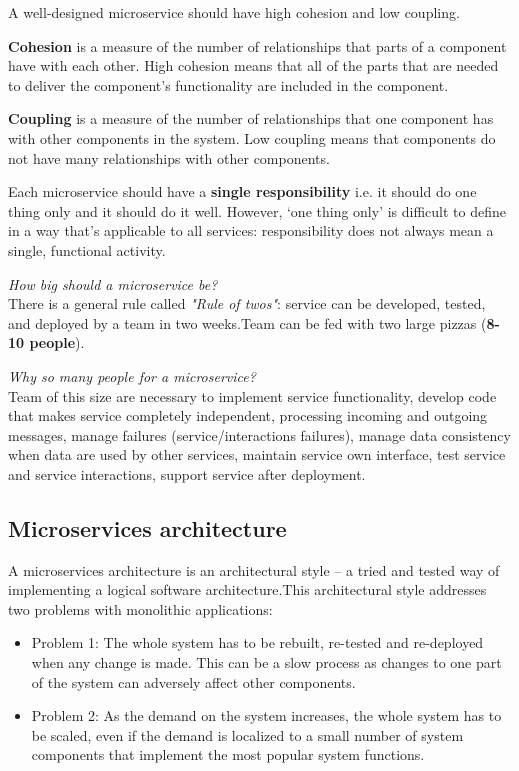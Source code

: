 \documentclass[10pt,a4paper]{report}
\begin{document}
A well-designed microservice should have high cohesion and low coupling.

\textbf{Cohesion} is a measure of the number of relationships that parts of a component have with each other. High cohesion means that all of the parts that are needed to deliver the component’s functionality are included in the component.

\textbf{Coupling} is a measure of the number of relationships that one component has with other components in the system. Low coupling means that components do not have many relationships with other components.

Each microservice should have a \textbf{single responsibility} i.e. it should do one thing only and it should do it well.
However, ‘one thing only’ is difficult to define in a way that’s applicable to all services: responsibility does not always mean a single, functional activity.

\textit{How big should a microservice be?} \\ 
There is a general rule called \textit{"Rule of twos"}: service can be developed, tested, and deployed by a team in two weeks.Team can be fed with two large pizzas (\textbf{8-10 people}).

\textit{Why so many people for a microservice?}\\
Team of this size are necessary to implement service functionality, develop code that makes service completely independent, processing incoming and outgoing messages, manage failures (service/interactions failures), manage data consistency when data are used by other services, maintain service own interface, test service and service interactions, support service after deployment.
\subsection{Microservices architecture}
A microservices architecture is an architectural style – a tried and tested way of implementing a logical software architecture.This architectural style addresses two problems with monolithic
applications:
\begin{itemize}
	\item Problem 1: The whole system has to be rebuilt, re-tested and re-deployed when any
	change is made. This can be a slow process as changes to one part of the
	system can adversely affect other components.
	\item Problem 2: As the demand on the system increases, the whole system has to be scaled,
	even if the demand is localized to a small number of system components that
	implement the most popular system functions.
\end{itemize}
\end{document}
